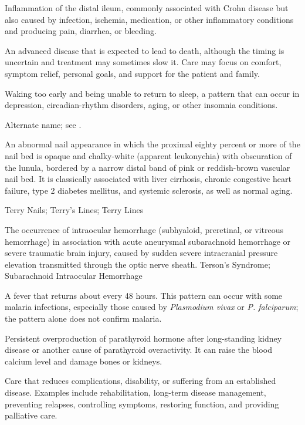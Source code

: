  Inflammation of the distal ileum, commonly associated with Crohn disease but also caused by infection, ischemia, medication, or other inflammatory conditions and producing pain, diarrhea, or bleeding.

 An advanced disease that is expected to lead to death, although the timing is uncertain and treatment may sometimes slow it. Care may focus on comfort, symptom relief, personal goals, and support for the patient and family.

 Waking too early and being unable to return to sleep, a pattern that can occur in depression, circadian-rhythm disorders, aging, or other insomnia conditions.

 Alternate name; see .

 An abnormal nail appearance in which the proximal eighty percent or more of the nail bed is opaque and chalky-white (apparent leukonychia) with obscuration of the lunula, bordered by a narrow distal band of pink or reddish-brown vascular nail bed. It is classically associated with liver cirrhosis, chronic congestive heart failure, type 2 diabetes mellitus, and systemic sclerosis, as well as normal aging.

\synonyms
Terry Nails; Terry's Lines; Terry Lines

 The occurrence of intraocular hemorrhage (subhyaloid, preretinal, or vitreous hemorrhage) in association with acute aneurysmal subarachnoid hemorrhage or severe traumatic brain injury, caused by sudden severe intracranial pressure elevation transmitted through the optic nerve sheath.
\synonyms
Terson's Syndrome; Subarachnoid Intraocular Hemorrhage

 A fever that returns about every 48 hours. This pattern can occur with some malaria infections, especially those caused by \textit{Plasmodium vivax} or \textit{P. falciparum}; the pattern alone does not confirm malaria.

 Persistent overproduction of parathyroid hormone after long-standing kidney disease or another cause of parathyroid overactivity. It can raise the blood calcium level and damage bones or kidneys.

 Care that reduces complications, disability, or suffering from an established disease. Examples include rehabilitation, long-term disease management, preventing relapses, controlling symptoms, restoring function, and providing palliative care.

